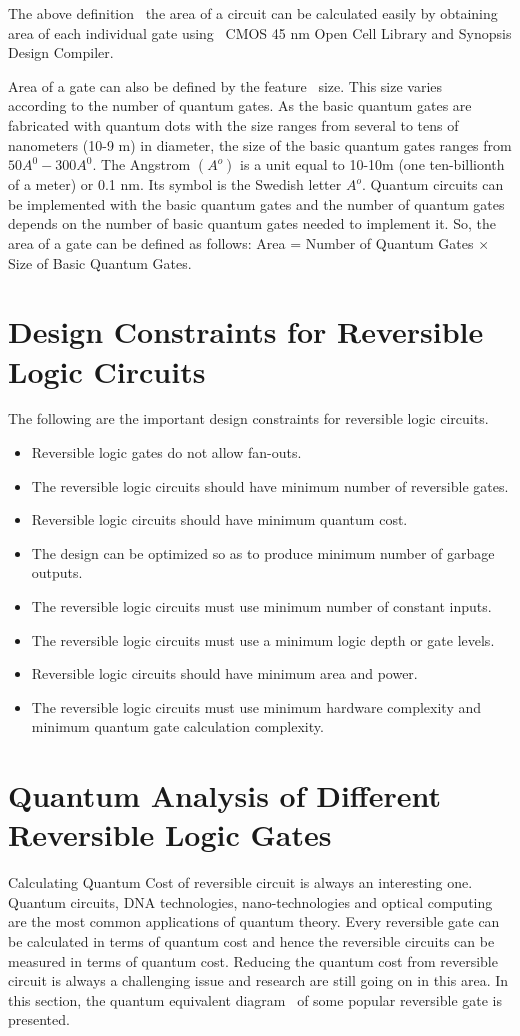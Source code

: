 The above definition~ the area of a circuit can be calculated easily by obtaining area of each individual gate using~ CMOS 45 nm Open Cell Library and Synopsis Design Compiler.

Area of a gate can also be defined by the feature~ size. This size varies~ according to the number of quantum gates. As the basic quantum gates are fabricated with quantum dots with the size ranges from several to tens of nanometers (10-9 m) in diameter, the size of the basic quantum gates ranges from $50A^0-300A^0$. The Angstrom $(A^o)$ is a unit equal to 10-10m (one ten-billionth of a meter) or 0.1 nm. Its symbol is the Swedish letter $A^o$. Quantum circuits can be implemented with the basic quantum gates and the number of quantum gates depends on the number of basic quantum gates needed to implement it. So, the area of a gate can be defined as follows: Area = Number of Quantum Gates $\times$ Size of Basic Quantum Gates.

\section{Design Constraints for Reversible Logic Circuits}
The following are the important design constraints for reversible logic circuits.

\begin{itemize}
\item Reversible logic gates do not allow fan-outs.
\item The reversible logic circuits should have minimum number of reversible gates.
\item Reversible logic circuits should have minimum quantum cost.
\item The design can be optimized so as to produce minimum number of garbage outputs.
\item The reversible logic circuits must use minimum number of constant inputs.
\item The reversible logic circuits must use a minimum logic depth or gate levels.
\item Reversible logic circuits should have minimum area and power.
\item The reversible logic circuits must use minimum hardware complexity and minimum quantum gate calculation complexity.
\end{itemize}

\section{Quantum Analysis of Different Reversible Logic Gates}
Calculating Quantum Cost of reversible circuit is always an interesting one. Quantum circuits, DNA technologies, nano-technologies and optical computing are the most common applications of quantum theory. Every reversible gate can be calculated in terms of quantum cost and hence the reversible circuits can be measured in terms of quantum cost. Reducing the quantum cost from reversible circuit is always a challenging issue and research are still going on in this area. In this section, the quantum equivalent diagram~ of some popular reversible gate is presented.

